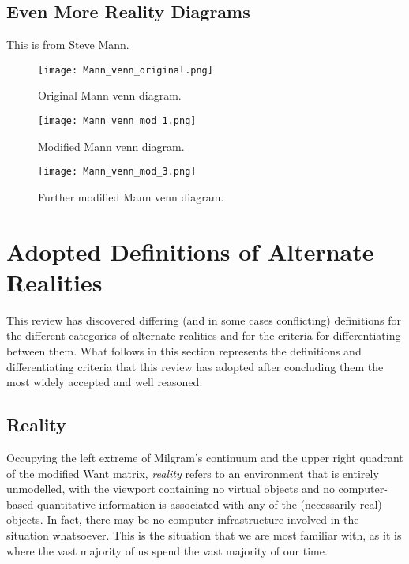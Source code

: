 \subsection{Even More Reality Diagrams}

This is from Steve Mann.

\begin{figure}
\centering
\begin{minipage}{.5\textwidth}
  \centering
  \texttt{[image: Mann\_venn\_original.png]}
  \caption{Original Mann venn diagram.}
\end{minipage}%
\begin{minipage}{.5\textwidth}
  \centering
  \texttt{[image: Mann\_venn\_mod\_1.png]}
    \caption{Modified Mann venn diagram.}
\end{minipage}
\end{figure}

\begin{figure}
\centering
  \texttt{[image: Mann\_venn\_mod\_3.png]}
  \caption{Further modified Mann venn diagram.}
\end{figure}



\clearpage

\section{Adopted Definitions of Alternate Realities}
\label{sec:definitions_of_alternate_realities}
This review has discovered differing (and in some cases conflicting) definitions for the different categories of alternate realities and for the criteria for differentiating between them. What follows in this section represents the definitions and differentiating criteria that this review has adopted after concluding them the most widely accepted and well reasoned.

\subsection{Reality}
Occupying the left extreme of Milgram's continuum and the upper right quadrant of the modified Want matrix, \textit{reality} refers to an environment that is entirely unmodelled, with the viewport containing no virtual objects and no computer-based quantitative information is associated with any of the (necessarily real) objects. In fact, there may be no computer infrastructure involved in the situation whatsoever. This is the situation that we are most familiar with, as it is where the vast majority of us spend the vast majority of our time.

